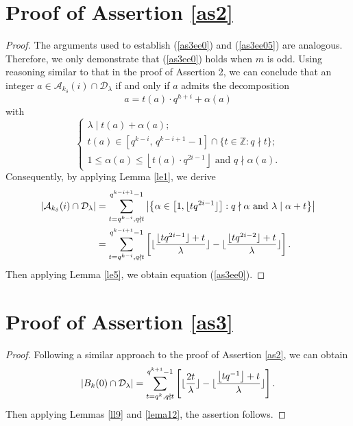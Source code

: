 \documentclass[journal,onecolumn]{IEEEtran}
\begin{document}
\section{Proof of Assertion \ref{as2}}
\begin{proof}
The arguments used to establish (\ref{as3ee0}) and (\ref{as3ee05}) are analogous.  Therefore, we only demonstrate that (\ref{as3ee0}) holds when $m$ is odd. Using reasoning similar to that in the proof of Assertion 2, we can conclude that an integer $a \in \mathcal{A}_{k_{\delta}}(i) \cap \mathcal{D}_{\lambda}$ if and only if $a$ admits the decomposition 
\begin{equation*}
a = t(a) \cdot q^{h+i} + \alpha(a)
\end{equation*}
with 
\begin{equation*}
\begin{cases}
\lambda \mid t(a) + \alpha(a); \\[1ex]
t(a) \in \left[q^{k-i},\, q^{k-i+1} - 1 \right] \cap \{ t \in \mathbb{Z} : q \nmid t \}; \\[1ex]
1 \leq \alpha(a) \leq \left\lfloor t(a) \cdot q^{2i-1} \right\rfloor  \text{ and }  q \nmid \alpha(a).
\end{cases}
\end{equation*}
 Consequently, by applying Lemma \ref{le1}, we derive 
\begin{equation}\notag
\begin{split}
\left| \mathcal{A}_{k_{\delta}}(i)\cap \mathcal{D}_{\lambda}\right|& =\sum\limits_{t=q^{k-i},q\nmid t}^{q^{k-i+1}-1}\left| \left\{ \alpha\in \left[1, \lfloor tq^{2i-1} \rfloor\right]: q\nmid \alpha \hbox{ and }\lambda\mid \alpha  + t     \right\}\right|\\
&=\sum\limits_{t=q^{k-i},q\nmid t}^{q^{k-i+1}-1} \left[\lfloor \frac{\lfloor tq^{2i-1}\rfloor+t}{\lambda}\rfloor -\lfloor \frac{\lfloor tq^{2i-2}\rfloor+t}{\lambda}\rfloor\right].
\end{split}
\end{equation}
Then applying Lemma \ref{le5}, we obtain equation (\ref{as3ee0}). 


\end{proof}

\section{Proof of Assertion \ref{as3}}
\begin{proof}
Following a similar approach to the proof of Assertion \ref{as2}, we can obtain 
\begin{equation}\notag
|B_k(0) \cap \mathcal{D}_{\lambda}| = 
    \sum_{t=q^{k}, q \nmid t}^{q^{k+1}-1} \left[ \lfloor \frac{2t}{\lambda} \rfloor - \lfloor \frac{\left\lfloor {t}{q}^{-1} \right\rfloor + t}{\lambda}\rfloor \right]. 
\end{equation}
Then applying Lemmas \ref{ll9} and \ref{lema12},  the assertion follows.
\end{proof}
\end{document}
